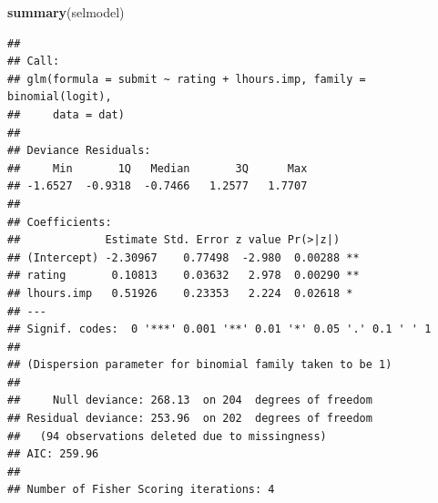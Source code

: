 \documentclass[]{article}
\newenvironment{Shaded}{\begin{snugshade}}{\end{snugshade}}
\newcommand{\KeywordTok}[1]{\textcolor[rgb]{0.13,0.29,0.53}{\textbf{#1}}}
\newcommand{\DataTypeTok}[1]{\textcolor[rgb]{0.13,0.29,0.53}{#1}}
\newcommand{\StringTok}[1]{\textcolor[rgb]{0.31,0.60,0.02}{#1}}
\newcommand{\CommentTok}[1]{\textcolor[rgb]{0.56,0.35,0.01}{\textit{#1}}}
\newcommand{\ControlFlowTok}[1]{\textcolor[rgb]{0.13,0.29,0.53}{\textbf{#1}}}
\newcommand{\OperatorTok}[1]{\textcolor[rgb]{0.81,0.36,0.00}{\textbf{#1}}}
\newcommand{\NormalTok}[1]{#1}
\let\oldShaded\Shaded
\let\endoldShaded\endShaded
\renewenvironment{Shaded}{\footnotesize\oldShaded}{\endoldShaded}
\begin{document}
\begin{Shaded}
\begin{Highlighting}[]
\KeywordTok{summary}\NormalTok{(selmodel)}
\end{Highlighting}
\end{Shaded}

\begin{verbatim}
## 
## Call:
## glm(formula = submit ~ rating + lhours.imp, family = binomial(logit), 
##     data = dat)
## 
## Deviance Residuals: 
##     Min       1Q   Median       3Q      Max  
## -1.6527  -0.9318  -0.7466   1.2577   1.7707  
## 
## Coefficients:
##             Estimate Std. Error z value Pr(>|z|)   
## (Intercept) -2.30967    0.77498  -2.980  0.00288 **
## rating       0.10813    0.03632   2.978  0.00290 **
## lhours.imp   0.51926    0.23353   2.224  0.02618 * 
## ---
## Signif. codes:  0 '***' 0.001 '**' 0.01 '*' 0.05 '.' 0.1 ' ' 1
## 
## (Dispersion parameter for binomial family taken to be 1)
## 
##     Null deviance: 268.13  on 204  degrees of freedom
## Residual deviance: 253.96  on 202  degrees of freedom
##   (94 observations deleted due to missingness)
## AIC: 259.96
## 
## Number of Fisher Scoring iterations: 4
\end{verbatim}

\begin{Shaded}
\end{Shaded}
\end{document}
